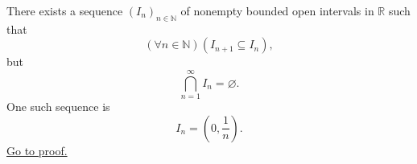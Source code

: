 \begin{proposition}
\label{prop:open-nested-intervals-need-not-have-nonempty-intersection}
There exists a sequence $(I_n)_{n\in\mathbb{N}}$ of nonempty bounded open
intervals in $\mathbb{R}$ such that
\[
  (\forall n\in\mathbb{N})(I_{n+1}\subseteq I_n),
\]
but
\[
  \bigcap_{n=1}^{\infty}I_n=\varnothing.
\]
One such sequence is
\[
  I_n=\left(0,\frac{1}{n}\right).
\]
\hyperref[prf:open-nested-intervals-need-not-have-nonempty-intersection]{Go to proof.}
\end{proposition}
